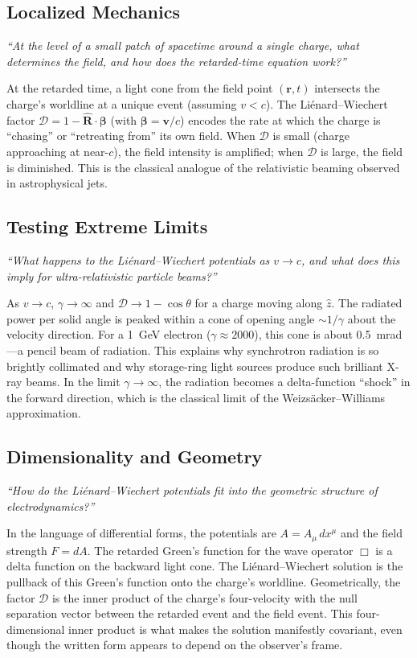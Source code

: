 \documentclass[11pt,openright]{book}
\begin{document}
\subsection*{Localized Mechanics}
\textit{``At the level of a small patch of spacetime around a single charge, what determines the field, and how does the retarded-time equation work?''}

At the retarded time, a light cone from the field point $(\mathbf{r}, t)$ intersects the charge's worldline at a unique event (assuming $v < c$). The Liénard--Wiechert factor $\mathcal{D} = 1 - \hat{\mathbf{R}}\cdot\boldsymbol{\beta}$ (with $\boldsymbol{\beta} = \mathbf{v}/c$) encodes the rate at which the charge is ``chasing'' or ``retreating from'' its own field. When $\mathcal{D}$ is small (charge approaching at near-$c$), the field intensity is amplified; when $\mathcal{D}$ is large, the field is diminished. This is the classical analogue of the relativistic beaming observed in astrophysical jets.

\subsection*{Testing Extreme Limits}
\textit{``What happens to the Liénard--Wiechert potentials as $v \to c$, and what does this imply for ultra-relativistic particle beams?''}

As $v \to c$, $\gamma \to \infty$ and $\mathcal{D} \to 1 - \cos\theta$ for a charge moving along $\hat{z}$. The radiated power per solid angle is peaked within a cone of opening angle $\sim 1/\gamma$ about the velocity direction. For a 1~GeV electron ($\gamma \approx 2000$), this cone is about 0.5~mrad---a pencil beam of radiation. This explains why synchrotron radiation is so brightly collimated and why storage-ring light sources produce such brilliant X-ray beams. In the limit $\gamma \to \infty$, the radiation becomes a delta-function ``shock'' in the forward direction, which is the classical limit of the Weizsäcker--Williams approximation.

\subsection*{Dimensionality and Geometry}
\textit{``How do the Liénard--Wiechert potentials fit into the geometric structure of electrodynamics?''}

In the language of differential forms, the potentials are $A = A_{\mu}\,dx^{\mu}$ and the field strength $F = dA$. The retarded Green's function for the wave operator $\Box$ is a delta function on the backward light cone. The Liénard--Wiechert solution is the pullback of this Green's function onto the charge's worldline. Geometrically, the factor $\mathcal{D}$ is the inner product of the charge's four-velocity with the null separation vector between the retarded event and the field event. This four-dimensional inner product is what makes the solution manifestly covariant, even though the written form appears to depend on the observer's frame.
\end{document}

